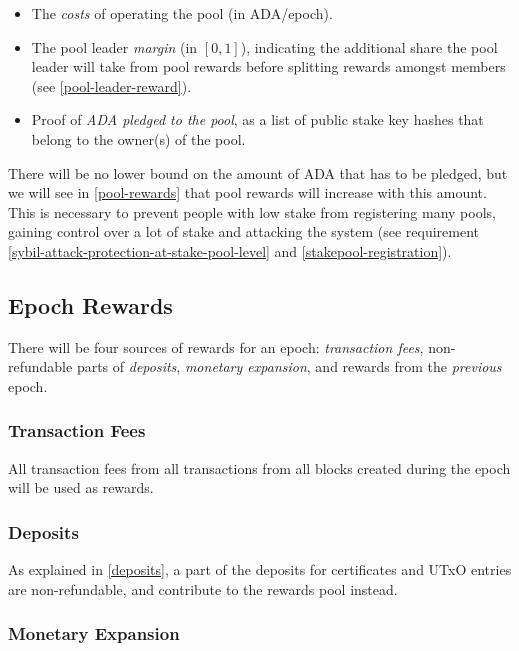 \documentclass[11pt,a4paper]{article}
\begin{document}
\begin{itemize}
\item
  The \emph{costs} of operating the pool (in ADA/epoch).
\item
  The pool leader \emph{margin} (in \([0,1]\)), indicating the
  additional share the pool leader will take from pool rewards before
  splitting rewards amongst members (see
  \cref{pool-leader-reward}).
\item
  Proof of \emph{ADA pledged to the pool}, as a list of public stake
  key hashes that belong to the owner(s) of the pool.
\end{itemize}

There will be no lower bound on the amount of ADA that has to be
pledged, but we will see in \cref{pool-rewards} that pool
rewards will increase with this amount. This is necessary to prevent
people with low stake from registering many pools, gaining control over
a lot of stake and attacking the system (see requirement
\ref{sybil-attack-protection-at-stake-pool-level} and \cref{stakepool-registration}).

\subsection{Epoch Rewards}
\label{epoch-rewards}

There will be four sources of rewards for an epoch: \emph{transaction
  fees}, non-refundable parts of \emph{deposits}, \emph{monetary
  expansion}, and rewards from the \emph{previous} epoch.

\subsubsection{Transaction Fees}
\label{transaction-fees-1}

All transaction fees from all transactions from all blocks created
during the epoch will be used as rewards.

\subsubsection{Deposits}
\label{deposits-1}

As explained in \cref{deposits}, a part of the deposits for
certificates and UTxO entries are non-refundable, and contribute to
the rewards pool instead.

\subsubsection{Monetary Expansion}
\label{monetary-expansion}
\end{document}

